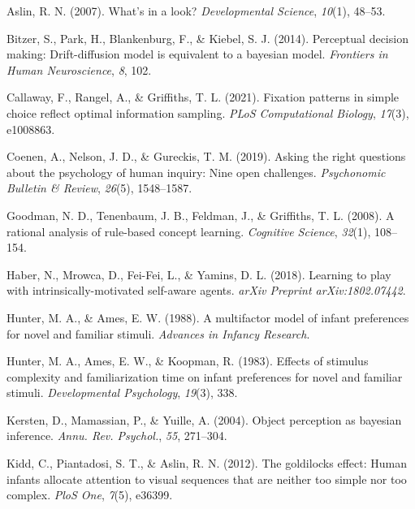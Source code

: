 \documentclass[10pt, letterpaper]{article}
\newenvironment{CSLReferences}%
  {}%
  {\par}
\begin{document}
\hypertarget{refs}{}
\begin{CSLReferences}{1}{0}
\leavevmode{}%
Aslin, R. N. (2007). What's in a look? \emph{Developmental Science},
\emph{10}(1), 48--53.

\leavevmode{}%
Bitzer, S., Park, H., Blankenburg, F., \& Kiebel, S. J. (2014).
Perceptual decision making: Drift-diffusion model is equivalent to a
bayesian model. \emph{Frontiers in Human Neuroscience}, \emph{8}, 102.

\leavevmode{}%
Callaway, F., Rangel, A., \& Griffiths, T. L. (2021). Fixation patterns
in simple choice reflect optimal information sampling. \emph{PLoS
Computational Biology}, \emph{17}(3), e1008863.

\leavevmode{}%
Coenen, A., Nelson, J. D., \& Gureckis, T. M. (2019). Asking the right
questions about the psychology of human inquiry: Nine open challenges.
\emph{Psychonomic Bulletin \& Review}, \emph{26}(5), 1548--1587.

\leavevmode{}%
Goodman, N. D., Tenenbaum, J. B., Feldman, J., \& Griffiths, T. L.
(2008). A rational analysis of rule-based concept learning.
\emph{Cognitive Science}, \emph{32}(1), 108--154.

\leavevmode{}%
Haber, N., Mrowca, D., Fei-Fei, L., \& Yamins, D. L. (2018). Learning to
play with intrinsically-motivated self-aware agents. \emph{arXiv
Preprint arXiv:1802.07442}.

\leavevmode{}%
Hunter, M. A., \& Ames, E. W. (1988). A multifactor model of infant
preferences for novel and familiar stimuli. \emph{Advances in Infancy
Research}.

\leavevmode{}%
Hunter, M. A., Ames, E. W., \& Koopman, R. (1983). Effects of stimulus
complexity and familiarization time on infant preferences for novel and
familiar stimuli. \emph{Developmental Psychology}, \emph{19}(3), 338.

\leavevmode{}%
Kersten, D., Mamassian, P., \& Yuille, A. (2004). Object perception as
bayesian inference. \emph{Annu. Rev. Psychol.}, \emph{55}, 271--304.

\leavevmode{}%
Kidd, C., Piantadosi, S. T., \& Aslin, R. N. (2012). The goldilocks
effect: Human infants allocate attention to visual sequences that are
neither too simple nor too complex. \emph{PloS One}, \emph{7}(5),
e36399.


\end{CSLReferences}
\end{document}
